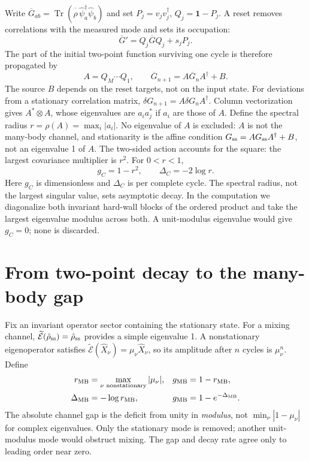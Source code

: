 \documentclass[aps,prb,twocolumn,10pt,raggedbottom,nofootinbib,superscriptaddress]{revtex4-2}
\newcommand{\id}{\mathbf{1}}
\newcommand{\Tr}{\operatorname{Tr}}
\newcommand{\E}{\widetilde{\mathcal E}}
\begin{document}
Write $\overline G_{ab}=\Tr(\overline{\hat\rho}\,
\hat\psi_a^\dagger\hat\psi_b)$ and set
$P_j=v_jv_j^\dagger$, $Q_j=\id-P_j$. A reset removes correlations
with the measured mode and sets its occupation:
\begin{equation}
 \overline G'=Q_j\overline GQ_j+s_jP_j. \label{eq:localG}
\end{equation}
The part of the initial two-point function surviving one cycle is
therefore propagated by
\begin{equation}
 A=Q_M\cdots Q_1,\qquad
 \overline G_{n+1}=A\overline G_nA^\dagger+B. \label{eq:cycle}
\end{equation}
The source $B$ depends on the reset targets, not on the input state.
For deviations from a stationary correlation matrix,
$\delta G_{n+1}=A\delta G_nA^\dagger$. Column vectorization gives
$A^*\otimes A$, whose eigenvalues are $a_i a_j^*$ if $a_i$ are those
of $A$. Define the spectral radius $r=\rho(A)=\max_i|a_i|$.
No eigenvalue of $A$ is excluded: $A$ is not the many-body channel,
and stationarity is the affine condition $G_{\rm ss}=AG_{\rm ss}A^\dagger+B$,
not an eigenvalue 1 of $A$. The two-sided action accounts for the square:
the largest covariance multiplier is $r^2$. For $0<r<1$,
\begin{equation}
 g_C=1-r^2,\qquad \Delta_C=-2\log r. \label{eq:rate}
\end{equation}
Here $g_C$ is dimensionless and $\Delta_C$ is per complete cycle.
The spectral radius, not the largest singular value, sets asymptotic
decay. In the computation we diagonalize both invariant hard-wall blocks
of the ordered product and take the largest eigenvalue modulus across
both. A unit-modulus eigenvalue would give $g_C=0$; none is discarded.

\section{From two-point decay to the many-body gap}
Fix an invariant operator sector containing the stationary state.
For a mixing channel, $\E(\hat\rho_{\rm ss})=\hat\rho_{\rm ss}$
provides a simple eigenvalue 1. A nonstationary eigenoperator satisfies
$\E(\hat X_\nu)=\mu_\nu\hat X_\nu$, so its amplitude after $n$
cycles is $\mu_\nu^n$. Define
\begin{align}
 r_{\rm MB}&=\max_{\nu\text{ nonstationary}}|\mu_\nu|,
 &g_{\rm MB}&=1-r_{\rm MB},\nonumber\\
 \Delta_{\rm MB}&=-\log r_{\rm MB},
 &g_{\rm MB}&=1-e^{-\Delta_{\rm MB}}. \label{eq:definition}
\end{align}
The absolute channel gap is the deficit from unity in \emph{modulus},
not $\min_\nu|1-\mu_\nu|$ for complex eigenvalues. Only the stationary
mode is removed; another unit-modulus mode would obstruct mixing.
The gap and decay rate agree only to leading order near zero.
\end{document}
